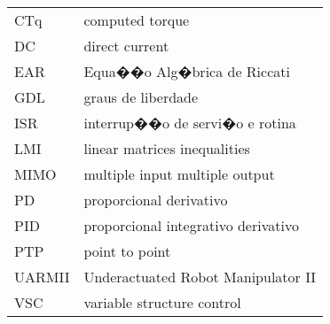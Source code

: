 \begin{longtable}{ll}
CTq & computed torque \\
DC & direct current \\
EAR & Equa��o Alg�brica de Riccati \\
GDL & graus de liberdade \\
ISR & interrup��o de servi�o e rotina \\
LMI & linear matrices inequalities \\
MIMO & multiple input multiple output \\
PD & proporcional derivativo \\
PID & proporcional integrativo derivativo \\
PTP & point to point \\
UARMII & Underactuated Robot Manipulator II \\
VSC & variable structure control \\

\end{longtable}

